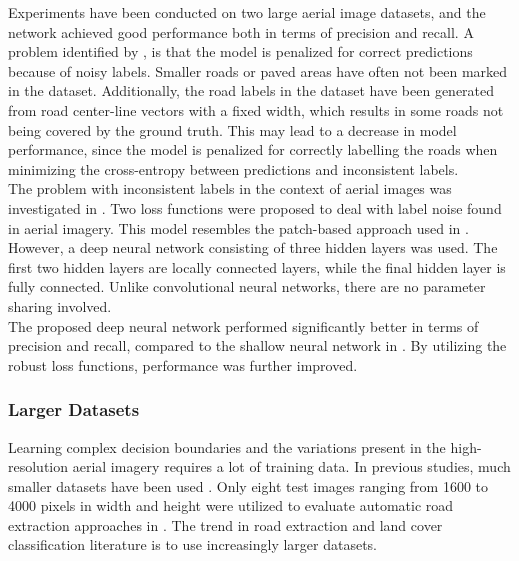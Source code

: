 Experiments have been conducted on two large aerial image datasets, and the network achieved good performance both in terms of precision and recall. A problem identified by \cite{Mnih_roads_high_res_aerial_images}, is that the model is penalized for correct predictions because of noisy labels. Smaller roads or paved areas have often not been marked in the dataset. Additionally, the road labels in the dataset have been generated from road center-line vectors with a fixed width, which results in some roads not being covered by the ground truth. This may lead to a decrease in model performance, since the model is penalized for correctly labelling the roads when minimizing the cross-entropy between predictions and inconsistent labels.\\

The problem with inconsistent labels in the context of aerial images was investigated in \citep{Mnih_aerial_images_noisy}. Two loss functions were proposed to deal with label noise found in aerial imagery. This model resembles the patch-based approach used in \cite{Mnih_roads_high_res_aerial_images}. However, a deep neural network consisting of three hidden layers was used. The first two hidden layers are locally connected layers, while the final hidden layer is fully connected. Unlike convolutional neural networks, there are no parameter sharing involved. \\

The proposed deep neural network performed significantly better in terms of precision and recall, compared to the shallow neural network in \citep{Mnih_roads_high_res_aerial_images}. By utilizing the robust loss functions, performance was further improved.\\

\subsubsection{Larger Datasets}
Learning complex decision boundaries and the variations present in the high-resolution aerial imagery requires a lot of training data. In previous studies, much smaller datasets have been used \citep{Mokhtarzade_road_ann} \citep{Song_road_extraction_svm}. Only eight test images ranging from 1600 to 4000 pixels in width and height were utilized to evaluate automatic road extraction approaches in \citep{Mayer_road_test}. The trend in road extraction and land cover classification literature is to use increasingly larger datasets.\\

